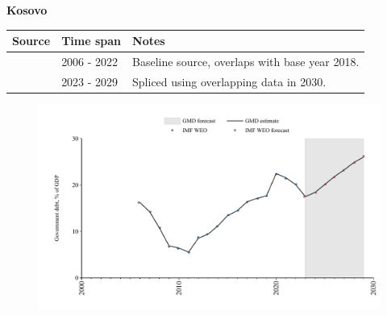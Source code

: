\documentclass[12pt,a4paper,landscape]{article}
\begin{document}
\begin{adjustbox}{max totalsize={\paperwidth}{\paperheight},center}
\begin{minipage}[t][\textheight][t]{\textwidth}
\vspace*{0.5cm}
{}
\begin{center}
{\Large\bfseries Kosovo}
\end{center}
\vspace{0.5cm}
\begin{table}[H]
\centering
\small
\begin{tabular}{|l|l|l|}
\hline
\textbf{Source} & \textbf{Time span} & \textbf{Notes} \\
\hline
\rowcolor{white}\cite{IMF_WEO}& 2006 - 2022 &Baseline source, overlaps with base year 2018.\\
\rowcolor{lightgray}\cite{IMF_WEO_forecast}& 2023 - 2029 &Spliced using overlapping data in 2030.\\
\hline
\end{tabular}
\end{table}
\begin{figure}[H]
\centering
\includegraphics[width=\textwidth,height=0.6\textheight,keepaspectratio]{graphs/XKX_govdebt_GDP.pdf}
\end{figure}
\end{minipage}
\end{adjustbox}
\end{document}
